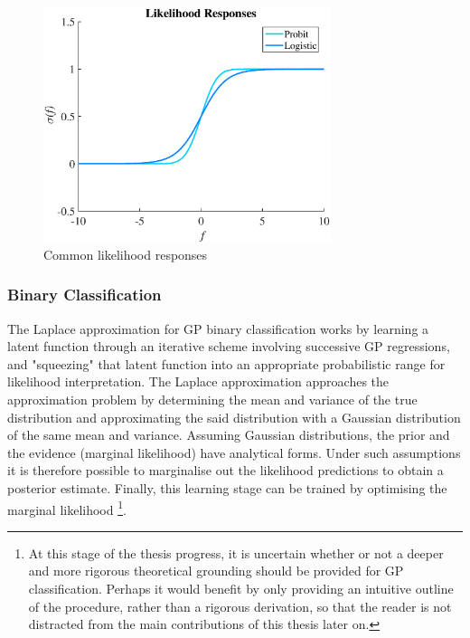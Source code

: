 				\begin{figure}[!htbp]
					\centering
						\includegraphics[width=0.75\textwidth]{Figures/responses.eps}
					\caption{Common likelihood responses}
					\label{Figure:LikelihoodResponses}
				\end{figure}
				
			\subsubsection{Binary Classification}
			\label{Background:GaussianProcesses:Classification:BinaryClassification}
			
				The Laplace approximation for GP binary classification works by learning a latent function through an iterative scheme involving successive GP regressions, and "squeezing" that latent function into an appropriate probabilistic range for likelihood interpretation. The Laplace approximation approaches the approximation problem by determining the mean and variance of the true distribution and approximating the said distribution with a Gaussian distribution of the same mean and variance. Assuming Gaussian distributions, the prior and the evidence (marginal likelihood) have analytical forms. Under such assumptions it is therefore possible to marginalise out the likelihood predictions to obtain a posterior estimate. Finally, this learning stage can be trained by optimising the marginal likelihood \footnote{{\color{BurntOrange} At this stage of the thesis progress, it is uncertain whether or not a deeper and more rigorous theoretical grounding should be provided for GP classification. Perhaps it would benefit by only providing an intuitive outline of the procedure, rather than a rigorous derivation, so that the reader is not distracted from the main contributions of this thesis later on.}}.
				
